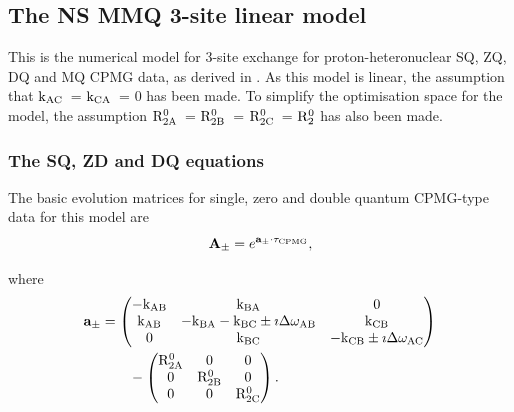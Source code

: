 
\subsection{The NS MMQ 3-site linear model}
\label{sect: dispersion: NS MMQ 3-site linear model}

This is the numerical model for 3-site exchange for proton-heteronuclear SQ, ZQ, DQ and MQ CPMG data, as derived in \citep{Korzhnev04a,Korzhnev04b,Korzhnev05b}.
As this model is linear, the assumption that $\textrm{k}_{\textrm{AC}}$~= $\textrm{k}_{\textrm{CA}}$~= 0 has been made.
To simplify the optimisation space for the model, the assumption $\mathrm{R}_{\mathrm{2A}}^0$~= $\mathrm{R}_{\mathrm{2B}}^0$~= $\mathrm{R}_{\mathrm{2C}}^0$~= $\mathrm{R}_2^0$ has also been made.


\subsubsection{The SQ, ZD and DQ equations}

The basic evolution matrices for single, zero and double quantum CPMG-type data for this model are
\begin{equation}
    \mathbf{A_{\pm}} = e^{\mathbf{a_{\pm}} \cdot \tau_{\textrm{CPMG}}},
\end{equation}

where
\begin{align}
    \mathbf{a_{\pm}} &= \begin{pmatrix}
                          -\textrm{k}_{\textrm{AB}} & \textrm{k}_{\textrm{BA}}                          & 0    \\
                          \textrm{k}_{\textrm{AB}}  & -\textrm{k}_{\textrm{BA}} -\textrm{k}_{\textrm{BC}} \pm\imath\Delta\omega_{\textrm{AB}}    & \textrm{k}_{\textrm{CB}} \\
                          0     & \textrm{k}_{\textrm{BC}}                          & -\textrm{k}_{\textrm{CB}} \pm\imath\Delta\omega_{\textrm{AC}}
                        \end{pmatrix}  \nonumber \\
                     &\qquad - \begin{pmatrix}
                                 \mathrm{R}_{\mathrm{2A}}^0 & 0          & 0    \\
                                 0          & \mathrm{R}_{\mathrm{2B}}^0 & 0    \\
                                 0          & 0          & \mathrm{R}_{\mathrm{2C}}^0
                               \end{pmatrix}.
\end{align}


